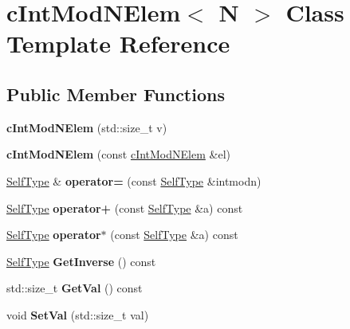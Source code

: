 \hypertarget{classcIntModNElem}{\section{c\-Int\-Mod\-N\-Elem$<$ \-N $>$ \-Class \-Template \-Reference}
\label{classcIntModNElem}
}
\subsection*{\-Public \-Member \-Functions}
\begin{DoxyCompactItemize}
\item 
\hypertarget{classcIntModNElem_a93be93aa382c5501b0f36322b24e93db}{{\bfseries c\-Int\-Mod\-N\-Elem} (std\-::size\-\_\-t v)}\label{classcIntModNElem_a93be93aa382c5501b0f36322b24e93db}

\item 
\hypertarget{classcIntModNElem_a878192260976d100695404d0bbc28484}{{\bfseries c\-Int\-Mod\-N\-Elem} (const \hyperlink{classcIntModNElem}{c\-Int\-Mod\-N\-Elem} \&el)}\label{classcIntModNElem_a878192260976d100695404d0bbc28484}

\item 
\hypertarget{classcIntModNElem_a0d0ae718c816556da6fcbf19454c676d}{\hyperlink{classcIntModNElem}{\-Self\-Type} \& {\bfseries operator=} (const \hyperlink{classcIntModNElem}{\-Self\-Type} \&intmodn)}\label{classcIntModNElem_a0d0ae718c816556da6fcbf19454c676d}

\item 
\hypertarget{classcIntModNElem_a10093e22457346b333e45f1414739497}{\hyperlink{classcIntModNElem}{\-Self\-Type} {\bfseries operator+} (const \hyperlink{classcIntModNElem}{\-Self\-Type} \&a) const }\label{classcIntModNElem_a10093e22457346b333e45f1414739497}

\item 
\hypertarget{classcIntModNElem_adff6836b0b7a20c50b6b9696aea66ca6}{\hyperlink{classcIntModNElem}{\-Self\-Type} {\bfseries operator$\ast$} (const \hyperlink{classcIntModNElem}{\-Self\-Type} \&a) const }\label{classcIntModNElem_adff6836b0b7a20c50b6b9696aea66ca6}

\item 
\hypertarget{classcIntModNElem_a641e400e55b454c2832262eabc8442b6}{\hyperlink{classcIntModNElem}{\-Self\-Type} {\bfseries \-Get\-Inverse} () const }\label{classcIntModNElem_a641e400e55b454c2832262eabc8442b6}

\item 
\hypertarget{classcIntModNElem_ad584ee8c4e7e57a16963e6cb5cd73c6d}{std\-::size\-\_\-t {\bfseries \-Get\-Val} () const }\label{classcIntModNElem_ad584ee8c4e7e57a16963e6cb5cd73c6d}

\item 
\hypertarget{classcIntModNElem_ac5d61d5866718ab5062d5030ac44b49e}{void {\bfseries \-Set\-Val} (std\-::size\-\_\-t val)}\label{classcIntModNElem_ac5d61d5866718ab5062d5030ac44b49e}

\end{DoxyCompactItemize}
